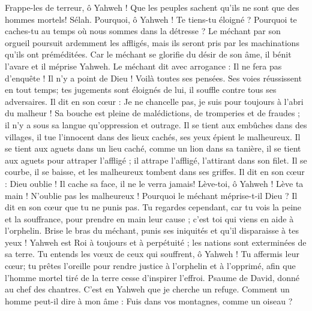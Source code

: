 \begin{multicols}{2}
Frappe-les de terreur, ô Yahweh ! Que les peuples sachent qu'ils ne sont que des hommes mortels! Sélah.
\VerseOne{}Pourquoi, ô Yahweh ! Te tiens-tu éloigné ? Pourquoi te caches-tu au temps où nous sommes dans la détresse ?
Le méchant par son orgueil poursuit ardemment les affligés, mais ils seront pris par les machinations qu'ils ont préméditées.
Car le méchant se glorifie du désir de son âme, il bénit l'avare et il méprise Yahweh.
Le méchant dit avec arrogance : Il ne fera pas d'enquête ! Il n'y a point de Dieu ! Voilà toutes ses pensées.
Ses voies réussissent en tout temps; tes jugements sont éloignés de lui, il souffle contre tous ses adversaires.
Il dit en son cœur : Je ne chancelle pas, je suis pour toujours à l'abri du malheur !
Sa bouche est pleine de malédictions, de tromperies et de fraudes ; il n'y a sous sa langue qu'oppression et outrage.
Il se tient aux embûches dans des villages, il tue l'innocent dans des lieux cachés, ses yeux épient le malheureux.
Il se tient aux aguets dans un lieu caché, comme un lion dans sa tanière, il se tient aux aguets pour attraper l'affligé ; il attrape l'affligé, l'attirant dans son filet.
Il se courbe, il se baisse, et les malheureux tombent dans ses griffes.
Il dit en son cœur : Dieu oublie ! Il cache sa face, il ne le verra jamais!
Lève-toi, ô Yahweh ! Lève ta main ! N'oublie pas les malheureux !
Pourquoi le méchant méprise-t-il Dieu ? Il dit en son cœur que tu ne punis pas.
Tu regardes cependant, car tu vois la peine et la souffrance, pour prendre en main leur cause ; c'est toi qui viens en aide à l'orphelin.
Brise le bras du méchant, punis ses iniquités et qu'il disparaisse à tes yeux !
Yahweh est Roi à toujours et à perpétuité ; les nations sont exterminées de sa terre.
Tu entends les vœux de ceux qui souffrent, ô Yahweh ! Tu affermis leur cœur; tu prêtes l'oreille
pour rendre justice à l'orphelin et à l'opprimé, afin que l'homme mortel tiré de la terre cesse d'inspirer l'effroi.
\VerseOne{}Psaume de David, donné au chef des chantres. C'est en Yahweh que je cherche un refuge. Comment un homme peut-il dire à mon âme : Fuis dans vos montagnes, comme un oiseau ?

\end{multicols}
